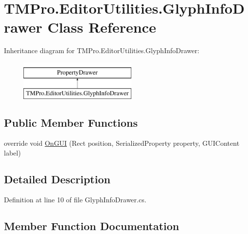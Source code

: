 \hypertarget{class_t_m_pro_1_1_editor_utilities_1_1_glyph_info_drawer}{}\section{T\+M\+Pro.\+Editor\+Utilities.\+Glyph\+Info\+Drawer Class Reference}
\label{class_t_m_pro_1_1_editor_utilities_1_1_glyph_info_drawer}
Inheritance diagram for T\+M\+Pro.\+Editor\+Utilities.\+Glyph\+Info\+Drawer\+:\begin{figure}[H]
\begin{center}
\leavevmode
\includegraphics[height=2.000000cm]{class_t_m_pro_1_1_editor_utilities_1_1_glyph_info_drawer}
\end{center}
\end{figure}
\subsection*{Public Member Functions}
\begin{DoxyCompactItemize}
\item 
override void \mbox{\hyperlink{class_t_m_pro_1_1_editor_utilities_1_1_glyph_info_drawer_acf3b5256bd7f4cfafdb93a42dbfb64a1}{On\+G\+UI}} (Rect position, Serialized\+Property property, G\+U\+I\+Content label)
\end{DoxyCompactItemize}


\subsection{Detailed Description}


Definition at line 10 of file Glyph\+Info\+Drawer.\+cs.



\subsection{Member Function Documentation}
\mbox{\label{class_t_m_pro_1_1_editor_utilities_1_1_glyph_info_drawer_acf3b5256bd7f4cfafdb93a42dbfb64a1}} 
